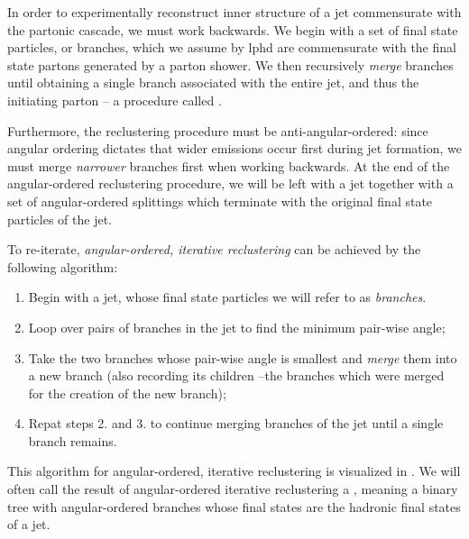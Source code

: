 In order to experimentally reconstruct inner structure of a jet commensurate with the partonic cascade, we must work backwards.
%
We begin with a set of final state particles, or branches, which we assume by \gls{lphd} are commensurate with the final state partons generated by a parton shower.
%
We then recursively \textit{merge} branches until obtaining a single branch associated with the entire jet, and thus the initiating parton -- a procedure called .



Furthermore, the \gls{reclustering} procedure must be anti-angular-ordered:
%
since angular ordering dictates that wider emissions occur first during jet formation, we must merge \textit{narrower} branches first when working backwards.
%
At the end of the angular-ordered \gls{reclustering} procedure, we will be left with a jet together with a set of angular-ordered splittings which terminate with the original final state particles of the jet.


To re-iterate, \textit{angular-ordered, iterative \gls{reclustering}} can be achieved by the following algorithm:
\begin{enumerate}
    \item
    Begin with a jet, whose final state particles we will refer to as \emph{branches}.

    \item
    Loop over pairs of branches in the jet to find the minimum pair-wise angle;

    \item
    Take the two branches whose pair-wise angle is smallest and \emph{merge} them into a new branch (also recording its children --the branches which were merged for the creation of the new branch);

    \item
    Repat steps 2. and 3. to continue merging branches of the jet until a single branch remains.
\end{enumerate}
%
This algorithm for angular-ordered, iterative \gls{reclustering} is visualized in .
%
We will often call the result of angular-ordered iterative \gls{reclustering} a , meaning a binary tree with angular-ordered branches whose final states are the hadronic final states of a jet.

\begin{figure}[]
    \centering
    \caption{
    }
    \label{fig:reclustering}
\end{figure}






